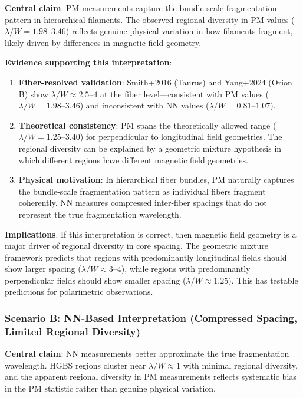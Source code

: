\documentclass[twoside,twocolumn]{mnras}
\begin{document}
\textbf{Central claim}: PM measurements capture the bundle-scale fragmentation pattern in hierarchical filaments. The observed regional diversity in PM values ($\lambda/W = 1.98$--$3.46$) reflects genuine physical variation in how filaments fragment, likely driven by differences in magnetic field geometry.

\textbf{Evidence supporting this interpretation}:
\begin{enumerate}
    \item \textbf{Fiber-resolved validation}: Smith+2016 (Taurus) and Yang+2024 (Orion B) show $\lambda/W \approx 2.5$--$4$ at the fiber level---consistent with PM values ($\lambda/W = 1.98$--$3.46$) and inconsistent with NN values ($\lambda/W = 0.81$--$1.07$).

    \item \textbf{Theoretical consistency}: PM spans the theoretically allowed range ($\lambda/W = 1.25$--$3.40$) for perpendicular to longitudinal field geometries. The regional diversity can be explained by a geometric mixture hypothesis in which different regions have different magnetic field geometries.

    \item \textbf{Physical motivation}: In hierarchical fiber bundles, PM naturally captures the bundle-scale fragmentation pattern as individual fibers fragment coherently. NN measures compressed inter-fiber spacings that do not represent the true fragmentation wavelength.
\end{enumerate}

\textbf{Implications}. If this interpretation is correct, then magnetic field geometry is a major driver of regional diversity in core spacing. The geometric mixture framework predicts that regions with predominantly longitudinal fields should show larger spacing ($\lambda/W \approx 3$--$4$), while regions with predominantly perpendicular fields should show smaller spacing ($\lambda/W \approx 1.25$). This has testable predictions for polarimetric observations.

\subsubsection{Scenario B: NN-Based Interpretation (Compressed Spacing, Limited Regional Diversity)}

\textbf{Central claim}: NN measurements better approximate the true fragmentation wavelength. HGBS regions cluster near $\lambda/W \approx 1$ with minimal regional diversity, and the apparent regional diversity in PM measurements reflects systematic bias in the PM statistic rather than genuine physical variation.
\end{document}
